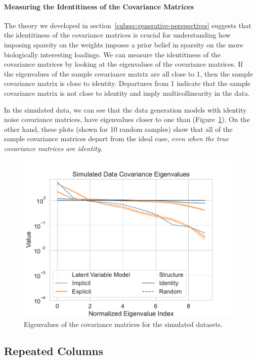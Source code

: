 \paragraph{Measuring the Identitiness of the Covariance Matrices}
The theory we developed in section~\ref{subsec:generative-perspectives} suggests that the identitiness of the covariance matrices is crucial for understanding how imposing sparsity on the \gls{weights} imposes a prior belief in sparsity on the more biologically interesting loadings.
We can measure the identitiness of the covariance matrices by looking at the eigenvalues of the covariance matrices.
If the eigenvalues of the sample covariance matrix are all close to 1, then the sample covariance matrix is close to identity.
Departures from 1 indicate that the sample covariance matrix is not close to identity and imply multicollinearity in the data.

In the simulated data, we can see that the data generation models with identity noise covariance matrices, have eigenvalues closer to one than (Figure~\ref{fig:covariance-eigenvalues-simulated-low}).
On the other hand, these plots (shown for 10 random samples) show that all of the sample covariance matrices depart from the ideal case, \textit{even when the true covariance matrices are identity}.

\begin{figure}
\centering
\includegraphics[width=0.8\linewidth]{figures/covariance/simulated_covariance_eigenvalues_low}
\caption{Eigenvalues of the covariance matrices for the simulated datasets.}\label{fig:covariance-eigenvalues-simulated-low}
\end{figure}


\subsection{Repeated Columns}\label{subsec:repeated-columns}

